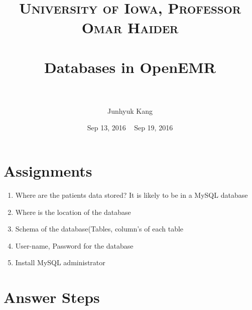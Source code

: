 \documentclass[paper=a4, fontsize=11pt]{scrartcl} %
\title{	
\normalfont \normalsize 
\textsc{University of Iowa, Professor Omar Haider} \\ [25pt] %
\horrule{0.5pt} \\[0.4cm] %
\huge Databases in OpenEMR \\ %
\horrule{2pt} \\[0.5cm] %
}
\author{Junhyuk Kang} %
\date{Sep 13, 2016 ~ Sep 19, 2016 } %
\numberwithin{equation}{section} %
\numberwithin{figure}{section} %
\numberwithin{table}{section} %
\begin{document}
\maketitle %


\section{Assignments}

\begin{enumerate}
  \item Where are the patients data stored? It is likely to be in a MySQL database
  \item Where is the location of the database
  \item Schema of the database(Tables, column's of each table
  \item User-name, Password for the database
  \item Install MySQL administrator
\end{enumerate}





\section{Answer Steps}
\end{document}
